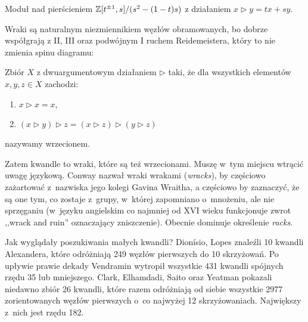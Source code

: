 \begin{example}
    Moduł nad pierścieniem $\mathbb Z[t^{\pm 1}, s]/(s^2 - (1-t)s)$ z działaniem $x \triangleright y = tx+sy$.
\end{example}

Wraki są naturalnym niezmiennikiem węzłów obramowanych, bo dobrze współgrają z II, III oraz podwójnym I ruchem Reidemeistera, który to nie zmienia spinu diagramu:
\begin{comment}
\[
    \LargeReidemeisterOneLeftRightQuandleProof
    \cong
    \LargeReidemeisterOneStraightQuandleProofRotated
\]
\end{comment}

\begin{definition}[wrzeciono]
%
    Zbiór $X$ z dwuargumentowym działaniem $\triangleright$ taki, że dla wszystkich elementów $x, y, z \in X$ zachodzi:
    \begin{enumerate}
        \item $x \triangleright x = x$,
        \item $(x \triangleright y) \triangleright z = (x \triangleright z) \triangleright (y \triangleright z)$
    \end{enumerate}
    nazywamy wrzecionem.
\end{definition}

Zatem kwandle to wraki, które są też wrzecionami.
Muszę w~tym miejscu wtrącić uwagę językową.
Conway nazwał wraki wrakami (\emph{wracks}), by częściowo zażartować z~nazwiska jego kolegi Gavina Wraitha, a częściowo by zaznaczyć, że są one tym, co zostaje z~grupy, w~której zapomniano o~mnożeniu, ale nie sprzęganiu (w~języku angielskim co najmniej od XVI wieku funkcjonuje zwrot ,,wrack and ruin'' oznaczający zniszczenie).
%
%
Obecnie dominuje określenie \emph{racks}.

Jak wyglądały poszukiwania małych kwandli?
Dionísio, Lopes \cite{lopes03} znaleźli 10 kwandli Alexandera, które odróżniają 249 węzłów pierwszych do 10 skrzyżowań.
%
%
Po upływie prawie dekady Vendramin \cite{vendramin12} wytropił wszystkie 431 kwandli spójnych rzędu 35 lub mniejszego.
%
Clark, Elhamdadi, Saito oraz Yeatman \cite{clark13} pokazali niedawno zbiór 26 kwandli, które razem odróżniają od siebie wszystkie 2977 zorientowanych węzłów pierwszych o~co najwyżej 12 skrzyżowaniach.
%
%
%
%
Największy z~nich jest rzędu 182.


